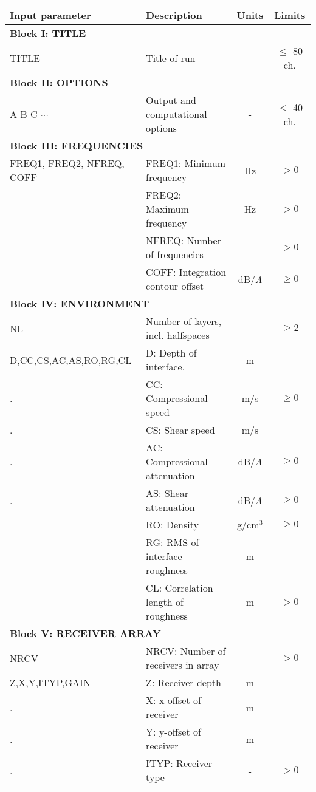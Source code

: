\begin{table}
\begin{center}
\small
\begin{tabular}{|l|l|c|c|}
\hline \hline
Input parameter & Description & Units & Limits \\
\hline \hline
\multicolumn{4}{|l|}{\bf Block I: TITLE}  \\ \hline
TITLE & Title of run  & - & $\leq$ 80 ch. \\
\hline
\multicolumn{4}{|l|}{\bf Block II: OPTIONS}  \\ \hline
A B C $\cdots$ & Output and computational options & - & $\leq$ 40 ch. \\
\hline
\multicolumn{4}{|l|}{\bf Block III: FREQUENCIES}  \\ \hline
FREQ1, FREQ2, NFREQ, COFF & FREQ1: Minimum frequency & Hz & $>0$ \\
 	& FREQ2: Maximum frequency & Hz & $>0$ \\
        & NFREQ: Number of frequencies & & $>0$ \\
 	& COFF: Integration contour offset & dB/$\Lambda$ & $\geq 0$ \\
\hline
\multicolumn{4}{|l|}{\bf Block IV: ENVIRONMENT}  \\ \hline
NL 	& Number of layers, incl. halfspaces	& - & $\geq 2$  \\
D,CC,CS,AC,AS,RO,RG,CL & D: Depth of interface. & m &  \\
.	& CC: Compressional speed & m/s & $\geq 0$ \\
.	& CS: Shear speed & m/s &  \\
.	& AC: Compressional attenuation & dB/$\Lambda$ & $\geq 0$ \\
.	& AS: Shear attenuation & dB/$\Lambda$ & $\geq 0$ \\
	& RO: Density 	& g/cm$^{3}$ & $\geq 0$ \\
	& RG: RMS of interface roughness & m &  \\
	& CL: Correlation length of roughness & m & $>0$ \\
\hline
\multicolumn{4}{|l|}{\bf Block V: RECEIVER ARRAY}  \\ \hline
NRCV & NRCV: Number of receivers in array & - & $>0$ \\
Z,X,Y,ITYP,GAIN & Z: Receiver depth & m & \\
.	& X: x-offset of receiver & m & \\ 
.	& Y: y-offset of receiver & m & \\
.	& ITYP: Receiver type  & - & $>0$ \\

\end{tabular}
\end{center}
\end{table}
